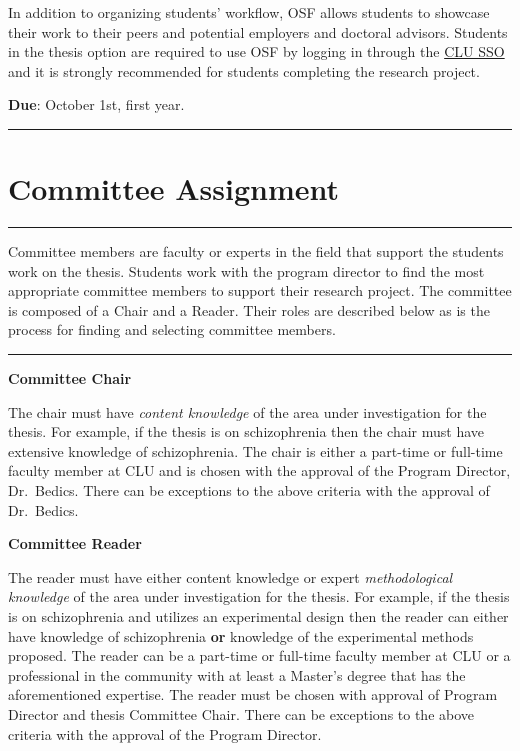 \documentclass[
  openany]{book}
\begin{document}
In addition to organizing students' workflow, OSF allows students to showcase their work to their peers and potential employers and doctoral advisors. Students in the thesis option are required to use OSF by logging in through the \href{https://accounts.osf.io/login?campaign=institution\&service=https\%3A\%2F\%2Fosf.io\%2Flogin\%2F\%3Fnext\%3Dhttps\%253A\%252F\%252Fosf.io\%252F}{CLU SSO} and it is strongly recommended for students completing the research project.

\textbf{Due}: October 1st, first year.

\begin{center}\rule{0.5\linewidth}{0.5pt}\end{center}

\hypertarget{committee-assignment}{%
\section{Committee Assignment}\label{committee-assignment}}

\begin{center}\rule{0.5\linewidth}{0.5pt}\end{center}

Committee members are faculty or experts in the field that support the students work on the thesis. Students work with the program director to find the most appropriate committee members to support their research project. The committee is composed of a Chair and a Reader. Their roles are described below as is the process for finding and selecting committee members.

\begin{center}\rule{0.5\linewidth}{0.5pt}\end{center}

\textbf{Committee Chair}

The chair must have \emph{content knowledge} of the area under investigation for the thesis. For example, if the thesis is on schizophrenia then the chair must have extensive knowledge of schizophrenia. The chair is either a part-time or full-time faculty member at CLU and is chosen with the approval of the Program Director, Dr.~Bedics. There can be exceptions to the above criteria with the approval of Dr.~Bedics.

\textbf{Committee Reader}

The reader must have either content knowledge or expert \emph{methodological knowledge} of the area under investigation for the thesis. For example, if the thesis is on schizophrenia and utilizes an experimental design then the reader can either have knowledge of schizophrenia \textbf{or} knowledge of the experimental methods proposed. The reader can be a part-time or full-time faculty member at CLU or a professional in the community with at least a Master's degree that has the aforementioned expertise. The reader must be chosen with approval of Program Director and thesis Committee Chair. There can be exceptions to the above criteria with the approval of the Program Director.
\end{document}
